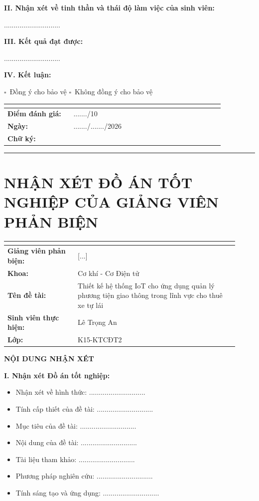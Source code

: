 \documentclass[13pt,a4paper]{extarticle}
\newcounter{none} %
\newcommand{\thesislongtableorignewline}{}
\let\thesislongtableorignewline\\
\renewcommand{\\}{\thesislongtableorignewline\hline}%
\let\\\thesislongtableorignewline
\newcommand{\majorheading}[1]{\clearpage\section*{#1}}
\newcommand{\checkbox}{\(\square\)}
\newcommand{\thesisspacer}{\hspace{2em}}
\providecommand{\tightlist}{%
  \setlength{\itemsep}{0pt}\setlength{\parskip}{0pt}}
\begin{document}
\textbf{II. Nhận xét về tinh thần và thái độ làm việc của sinh viên:}

.............................

\textbf{III. Kết quả đạt được:}

.............................

\textbf{IV. Kết luận:}

\checkbox\ Đồng ý cho bảo vệ \thesisspacer \checkbox\ Không đồng ý cho bảo vệ

{\def\LTcaptype{none} %
\begin{longtable}{|p{0.28\linewidth}|p{0.64\linewidth}|}
\hline \textbf{} & \textbf{} \\
\hline
\endhead
\hline
\endlastfoot
\textbf{Điểm đánh giá:} & ......./10 \\
\textbf{Ngày:} & ......./......./2026 \\
\textbf{Chữ ký:} & \\
\end{longtable}
}

\begin{center}\rule{0.5\linewidth}{0.5pt}\end{center}

\majorheading{NHẬN XÉT ĐỒ ÁN TỐT NGHIỆP CỦA GIẢNG VIÊN PHẢN BIỆN}

{\def\LTcaptype{none} %
\begin{longtable}{|p{0.28\linewidth}|p{0.64\linewidth}|}
\hline \textbf{} & \textbf{} \\
\hline
\endhead
\hline
\endlastfoot
\textbf{Giảng viên phản biện:} & {[}...{]} \\
\textbf{Khoa:} & Cơ khí - Cơ Điện tử \\
\textbf{Tên đề tài:} & Thiết kế hệ thống IoT cho ứng dụng quản lý phương
tiện giao thông trong lĩnh vực cho thuê xe tự lái \\
\textbf{Sinh viên thực hiện:} & Lê Trọng An \\
\textbf{Lớp:} & K15-KTCĐT2 \\
\end{longtable}
}

\textbf{NỘI DUNG NHẬN XÉT}

\textbf{I. Nhận xét Đồ án tốt nghiệp:}

\begin{itemize}
\tightlist
\item
  Nhận xét về hình thức: .............................
\item
  Tính cấp thiết của đề tài: .............................
\item
  Mục tiêu của đề tài: .............................
\item
  Nội dung của đề tài: .............................
\item
  Tài liệu tham khảo: .............................
\item
  Phương pháp nghiên cứu: .............................
\item
  Tính sáng tạo và ứng dụng: .............................
\end{itemize}
\end{document}
